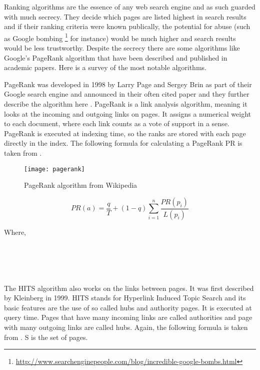 Ranking algorithms are the essence of any web search engine and as such guarded with much secrecy. They decide which pages are listed highest in search results and if their ranking criteria were known publically, the potential for abuse (such as Google bombing \footnote{\url{http://www.searchenginepeople.com/blog/incredible-google-bombs.html}} for instance) would be much higher and search results would be less trustworthy. Despite the secrecy there are some algorithms like Google's PageRank algorithm that have been described and published in academic papers. Here is a survey of the most notable algorithms.

PageRank was developed in 1998 by Larry Page and Sergey Brin as part of their Google search engine and announced in their often cited paper \citep{Brin1998b} and they further describe the algorithm here \citep{Brin1998}. PageRank is a link analysis algorithm, meaning it looks at the incoming and outgoing links on pages. It assigns a numerical weight to each document, where each link counts as a vote of support in a sense. PageRank is executed at indexing time, so the ranks are stored with each page directly in the index. The following formula for calculating a PageRank PR is taken from \citep[p.472]{Baeza-Yates2011}.

\begin{figure}[htb] %
  \centering
  \texttt{[image: pagerank]}
\caption[PageRank algorithm]{PageRank algorithm from Wikipedia}
\label{fig:pagerank}
\end{figure}

\begin{equation}
  PR(a) =
  \frac{q}{T} + (1 - q)
  \sum_{i=1}^{n} \frac{PR(p_i)}{L(p_i)}
  \label{eq:PR}
\end{equation}

Where,\\
 \\
 \\
 \\
 \\
\itab{} 

The HITS algorithm also works on the links between pages. It was first described by Kleinberg \citep[p.472]{Kleinberg1999, Kleinberg} in 1999. HITS stands for Hyperlink Induced Topic Search and its basic features are the use of so called hubs and authority pages. It is executed at query time. Pages that have many incoming links are called authorities and page with many outgoing links are called hubs. Again, the following formula is taken from \citep[p.471]{Baeza-Yates2011}. S is the set of pages.

